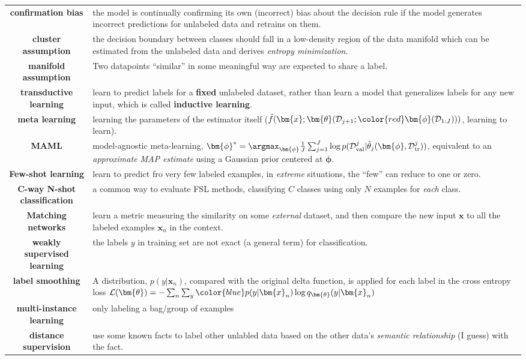 \begin{table}[htpb]
{\begin{tabular}{cp{32em}}
        \textbf{confirmation bias} & the model is continually confirming its own (incorrect) bias about the decision rule if the model generates incorrect predictions for unlabeled data and retrains on them.\\
        \textbf{cluster assumption} & the decision boundary between classes should fall in a low-density region of the data manifold which can be estimated from the unlabeled data and derives \textit{entropy minimization}. \\
        \textbf{manifold assumption} & Two datapoints ``similar'' in some meaningful way are expected to share a label. \\
        \textbf{transductive learning} & learn to predict labels for a \textbf{fixed} unlabeled dataset, rather than learn a model that generalizes labels for any new input, which is called \textbf{inductive learning}. \\
        \textbf{meta learning} & learning the parameters of the estimator itself ($\hat{f}(\bm{x};\bm{\theta}(\mathcal{D}_{j+1};{\color{red}\bm{\phi}(\mathcal{D}_{1:J})}))$, learning to learn). \\
        \textbf{MAML} & model-agnostic meta-learning, $\bm{\phi}^*=\argmax_{\bm{\phi}}\frac{1}{J}\sum_{j=1}^J\log p(\mathcal{D}_\text{val}^j|\hat{\theta}_{j}(\bm{\phi},\mathcal{D}_\text{tr}^j))$, equivalent to an \textit{approximate MAP estimate} using a Gaussian prior centered at $\bm{\phi}$. \\
        \textbf{Few-shot learning} & learn to predict fro very few labeled examples, 
        in \textit{extreme} situations, the ``few'' can reduce to one or zero. \\
        \textbf{C-way N-shot classification} & a common way to evaluate FSL methods, classifying $C$ classes using only $N$ examples for \textit{each} class.\\
        \textbf{Matching networks} & learn a metric measuring the similarity on some \textit{external} dataset, and then compare the new input $\bm{x}$ to all the labeled examples $\bm{x}_n$ in the context. \\
        \textbf{weakly supervised learning} & the labels $y$ in training set are not exact (a general term) for classification. \\
        \textbf{label smoothing} & A distribution, $p(y|\bm{x}_n)$, compared with the original delta function, is applied for each label in the cross entropy loss $\mathcal{L}(\bm{\theta})=-\sum_n\sum_y {\color{blue}p(y|\bm{x}_n)}\log q_{\bm{\theta}}(y|\bm{x}_n)$ \\
        \textbf{multi-instance learning} & only labeling a bag/group of examples \\
        \textbf{distance supervision} & use some known facts to label other unlabled data based on the other data's \textit{semantic relationship} (I guess) with the fact. \\
        \bottomrule
    \end{tabular}}
    \label{tab:fewexamplars}
\end{table}

